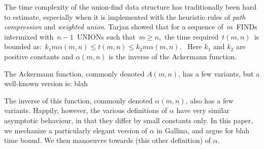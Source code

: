 The time complexity of the union-find data structure has traditionally
been hard to estimate, especially when it is implemented with the 
heuristic rules of \emph{path compression} and \emph{weighted union}. 
Tarjan showed that for a sequence of~$m$~FINDs intermixed with~$n-1$~UNIONs 
such that~$m \geq n$,~the time required~$t(m,n)$~is bounded
as:~$k_{1}m\alpha(m,n) \leq t(m,n) \leq k_{2}m\alpha(m,n)$.~
Here $k_{1}$ and $k_{2}$ are positive constants and $\alpha(m,n)$ is 
the inverse of the Ackermann function.

The Ackermann function, commonly denoted $A(m,n)$, has a few variants,
but a well-known version is:
blah

The inverse of this function, commonly denoted $\alpha(m,n)$, 
also has a few variants. Happily, however, the various definitions 
of $\alpha$ have very similar asymptotic behaviour, in that they 
differ by small constants only. In this paper, we mechanize a 
particularly elegant version of $\alpha$ in Gallina, and argue 
for blah time bound. We then manoeuvre towards (this other definition)
of $\alpha$. 